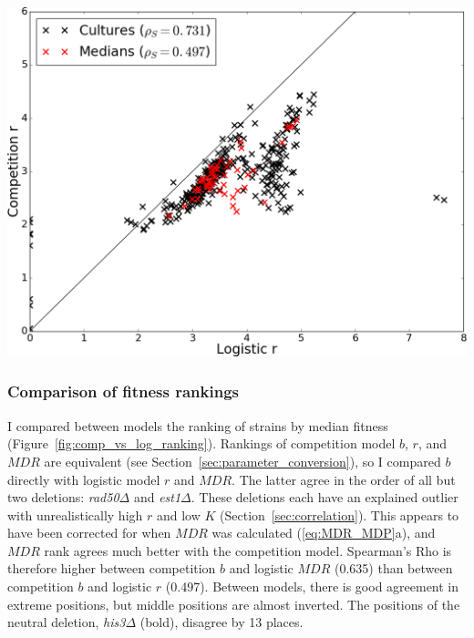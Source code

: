 \begin{multicols}{2}
\graphicspath{{images/p15_correlations/}}
\begin{Figure}
  \centering
  \includegraphics[width=\linewidth]{final/r_correlations_median_spearmans_trimmed_2}
  \label{fig:P15_correlations}
\end{Figure}

\subsubsection{Comparison of fitness rankings}

I compared between models the ranking of strains by median fitness
(Figure~\ref{fig:comp_vs_log_ranking}). Rankings of competition model
\(b\), \(r\), and \(MDR\) are equivalent (see
Section~\ref{sec:parameter_conversion}), so I compared \(b\) directly
with logistic model \(r\) and \(MDR\). The latter agree in the order
of all but two deletions: \textit{rad50\(\Delta\)} and
\textit{est1\(\Delta\)}. These deletions each have an explained
outlier with unrealistically high \(r\) and low \(K\)
(Section~\ref{sec:correlation}). This appears to have been corrected
for when \(MDR\) was calculated (\ref{eq:MDR_MDP}a), and \(MDR\) rank
agrees much better with the competition model. Spearman's Rho is
therefore higher between competition \(b\) and logistic \(MDR\)
(0.635) than between competition \(b\) and logistic \(r\)
(0.497). Between models, there is good agreement in extreme positions,
but middle positions are almost inverted. The positions of the neutral
deletion, \textit{his3\(\Delta\)} (bold), disagree by 13 places.


\end{multicols}
